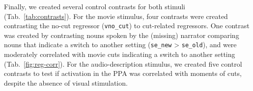 \documentclass[english]{article}
\begin{document}
Finally, we created several control contrasts for both stimuli
(Tab.~\ref{tab:contrasts}).
For the movie stimulus, four contrasts were created contrasting the no-cut
regressor (\texttt{vno\_cut}) to cut-related regressors.
One contrast was created by contrasting nouns spoken by the (missing) narrator
comparing nouns that indicate a switch to another setting (\texttt{se\_new} >
\texttt{se\_old}), and were moderately correlated with movie cuts indicating a
switch to another setting (Tab.~\ref{fig:reg-corr}).
For the audio-description stimulus, we created five control contrasts to test if
activation in the PPA was correlated with moments of cuts, despite the absence
of visual stimulation.

\end{document}
